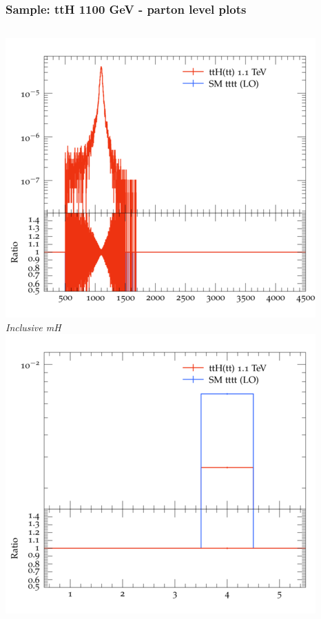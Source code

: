 \documentclass{beamer}
\begin{document}
\begin{frame}
\frametitle{Sample: ttH 1100 GeV - parton level plots}
\begin{columns}
\includegraphics[width=\textwidth]{../plots/ttH_1100/tttt_ttH/Inclusive_mH.png}\\
\textit{\small Inclusive mH}
\includegraphics[width=\textwidth]{../plots/ttH_1100/tttt_ttH/Inclusive_nTop.png}\\

\end{columns}
\end{frame}
\end{document}
